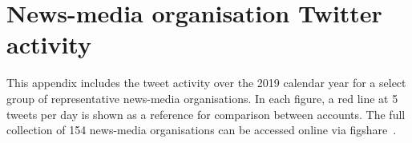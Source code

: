 \chapter{News-media organisation Twitter activity \label{app:activity}}

This appendix includes the tweet activity over the 2019 calendar year for a select group of representative news-media organisations. In each figure, a red line at 5 tweets per day is shown as a reference for comparison between accounts. The full collection of 154 news-media organisations can be accessed online via figshare~\cite{figshareSouth2021}.
\captionsetup[figure]{list=no,hypcap=false} 















